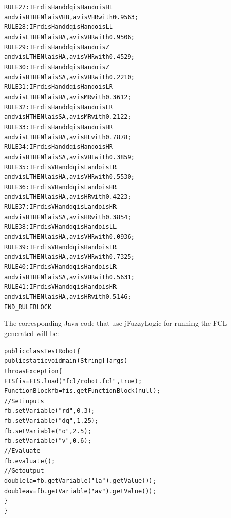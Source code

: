 \documentclass[11pt,twoside]{article}
\begin{document}
\begin{multicols}{2}
\begin{scriptsize}
\begin{alltt}
RULE 27: IF rd is  H and dq is H and o is HL 
    and v is H THEN la is VHB , av is VHR with 0.9563;
RULE 28: IF rd is  H and dq is H and o is LL 
    and v is L THEN la is  HA , av is VHR with 0.9506;
RULE 29: IF rd is  H and dq is H and o is  Z 
    and v is L THEN la is  HA , av is VHR with 0.4529;
RULE 30: IF rd is  H and dq is H and o is  Z 
    and v is H THEN la is  SA , av is VHR with 0.2210;
RULE 31: IF rd is  H and dq is H and o is LR 
    and v is L THEN la is  HA , av is  MR with 0.3612;
RULE 32: IF rd is  H and dq is H and o is LR 
    and v is H THEN la is  SA , av is  MR with 0.2122;
RULE 33: IF rd is  H and dq is H and o is HR 
    and v is L THEN la is  HA , av is  HL with 0.7878;
RULE 34: IF rd is  H and dq is H and o is HR 
    and v is H THEN la is  SA , av is VHL with 0.3859;
RULE 35: IF rd is VH and dq is L and o is LR 
    and v is L THEN la is  HA , av is VHR with 0.5530;
RULE 36: IF rd is VH and dq is L and o is HR 
    and v is L THEN la is  HA , av is  HR with 0.4223;
RULE 37: IF rd is VH and dq is L and o is HR 
    and v is H THEN la is  SA , av is  HR with 0.3854;
RULE 38: IF rd is VH and dq is H and o is LL 
    and v is L THEN la is  HA , av is VHR with 0.0936;
RULE 39: IF rd is VH and dq is H and o is LR 
    and v is L THEN la is  HA , av is VHR with 0.7325;
RULE 40: IF rd is VH and dq is H and o is LR 
    and v is H THEN la is  SA , av is VHR with 0.5631;
RULE 41: IF rd is VH and dq is H and o is HR 
    and v is L THEN la is  HA , av is  HR with 0.5146;
END\_RULEBLOCK
\end{alltt}
\end{scriptsize}
\vspace*{10pt}

\vspace*{10pt}
The corresponding Java code that use jFuzzyLogic for running the FCL generated will be:
\\
\begin{scriptsize}
\begin{alltt}
public class TestRobot \{
  public static void main(String[] args) 
  throws Exception \{
    FIS fis = FIS.load("fcl/robot.fcl", true);
    FunctionBlock fb = fis.getFunctionBlock(null);
    // Set inputs
    fb.setVariable("rd", 0.3); 
    fb.setVariable("dq", 1.25);
    fb.setVariable("o", 2.5); 
    fb.setVariable("v", 0.6);
    // Evaluate
    fb.evaluate(); 
    // Get output
    double la = fb.getVariable("la").getValue());
    double av = fb.getVariable("av").getValue());
  \}
\}
\end{alltt}
\end{scriptsize}



\end{multicols}
\end{document}
